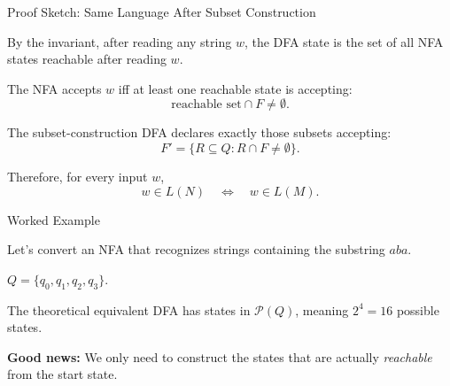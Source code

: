 \documentclass[10pt,aspectratio=169]{beamer}
\newcommand{\powset}[1]{\mathcal P({#1})}
\begin{document}
\begin{frame}{Proof Sketch: Same Language After Subset Construction}

\small
By the invariant, after reading any string \(w\), the DFA state is the set of all NFA states reachable after reading \(w\).

\vspace{0.8em}
The NFA accepts \(w\) iff at least one reachable state is accepting:
\[
\text{reachable set}\cap F\neq\emptyset.
\]

\vspace{0.8em}
The subset-construction DFA declares exactly those subsets accepting:
\[
F'=\{R\subseteq Q:R\cap F\neq\emptyset\}.
\]

\vspace{0.8em}
Therefore, for every input \(w\),
\[
w\in L(N)\quad\Longleftrightarrow\quad w\in L(M).
\]

\end{frame}

\begin{frame}{Worked Example}

Let's convert an NFA that recognizes strings containing the substring $aba$.

\vspace{1em}

\begin{center}
\end{center}

\vspace{1em}

$Q = \{q_0, q_1, q_2, q_3\}$.

The theoretical equivalent DFA has states in $\powset{Q}$, meaning $2^4 = 16$ possible states. 

\pause
\vspace{0.5em}
\textbf{Good news:} We only need to construct the states that are actually \textit{reachable} from the start state.

\end{frame}
\end{document}
